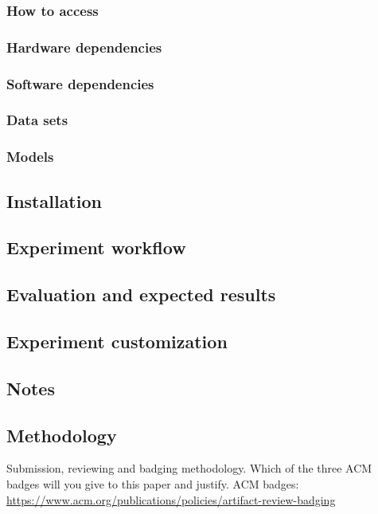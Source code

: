 \documentclass[sigconf,10pt, screen]{acmart}
\begin{document}
\subsubsection{How to access}

\subsubsection{Hardware dependencies}

\subsubsection{Software dependencies}

\subsubsection{Data sets}

\subsubsection{Models}

\subsection{Installation}

\subsection{Experiment workflow}

\subsection{Evaluation and expected results}


\subsection{Experiment customization}

\subsection{Notes}

\subsection{Methodology}

Submission, reviewing and badging methodology. Which of the three ACM badges will you give to this paper and justify. ACM badges: \url{https://www.acm.org/publications/policies/artifact-review-badging}



\end{document}
